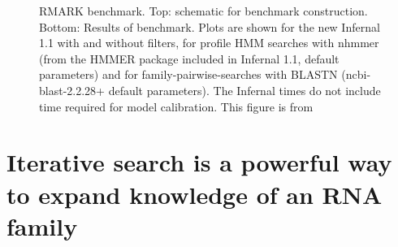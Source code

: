 \documentclass[custom,landscape,final,30pt,plainboxedsections]{sciposter-titleskipsmall}
\begin{document}
\begin{multicols}{3}

\begin{footnotesize}
\begin{figure}
\caption{
RMARK benchmark. Top: schematic for benchmark
construction. Bottom: Results of benchmark. Plots are shown for the new
Infernal 1.1 with and without filters, for
profile HMM searches with nhmmer \cite{Wheeler13b} (from the HMMER package included in
Infernal 1.1, default parameters) and for family-pairwise-searches
with BLASTN (ncbi-blast-2.2.28+ default parameters). The Infernal
times do not include time required for model calibration. This figure
is from \cite{Nawrocki13c}}
\label{fig:rmark}
\end{figure}
\end{footnotesize}

\vspace{0.5in}

\section*{Iterative search is a powerful way to expand knowledge of an
  RNA family}


\end{multicols}
\end{document}
